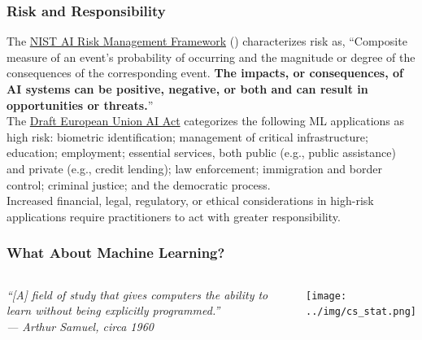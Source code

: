 \documentclass[11pt,aspectratio=169,hyperref={colorlinks}]{beamer}
\begin{document}
		\begin{frame}
	
			\frametitle{Risk and Responsibility}
	
				\small{The \href{https://nvlpubs.nist.gov/nistpubs/ai/NIST.AI.100-1.pdf}{NIST AI Risk Management Framework} (\citet{tabassi2023artificial}) characterizes risk as, ``Composite measure of an event’s probability of occurring and the magnitude or degree of the consequences of the corresponding event. \textbf{The impacts, or consequences, of AI systems can be positive, negative, or both and can result in opportunities or threats.}''}\\
				\vspace{10pt}
				\small{The \href{https://artificialintelligenceact.eu/}{Draft European Union AI Act} categorizes the following ML applications as high risk: biometric identification; management of critical infrastructure; education; employment; essential services, both public (e.g., public assistance) and private (e.g., credit lending); law enforcement; immigration and border control; criminal justice; and the democratic process.}\\
				\vspace{10pt}
				\small{Increased financial, legal, regulatory, or ethical considerations in high-risk applications require practitioners to act with greater responsibility.}

		\end{frame}	

		\begin{frame}

			\frametitle{What About Machine Learning?}

			\begin{columns}
		
				\column{0.5\linewidth}
					\textit{``[A] field of study that gives computers the ability to learn without being explicitly programmed.''\\ \hspace{20pt} --- \textup{Arthur Samuel}, circa 1960}
	
				\column{0.5\linewidth}
						\centering
						\texttt{[image: ../img/cs\_stat.png]}
						\label{fig:cs_stat}

			\end{columns}
	
		\end{frame}	
\end{document}
